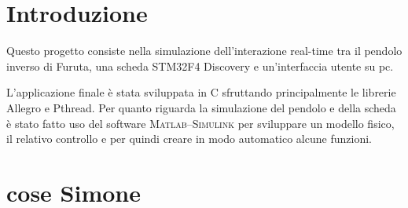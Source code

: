 \section{Introduzione}
Questo progetto consiste nella simulazione dell'interazione real-time tra il pendolo inverso di Furuta, una scheda STM32F4 Discovery e un'interfaccia utente su pc. 

L'applicazione finale \`e stata sviluppata in C sfruttando principalmente le librerie Allegro e Pthread. Per quanto riguarda la simulazione del pendolo e della scheda \`e stato fatto uso del software \textsc{Matlab--Simulink} per sviluppare un modello fisico, il relativo controllo e per quindi creare in modo automatico alcune funzioni.


\section{cose Simone}
